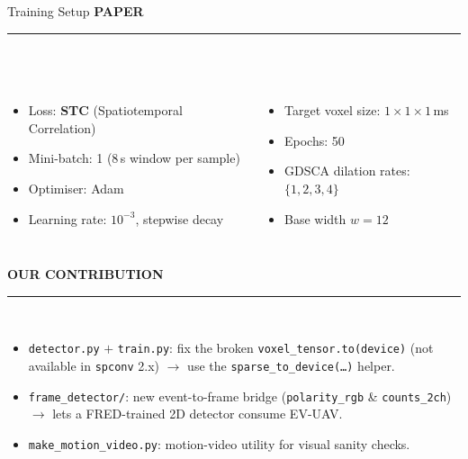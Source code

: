 \documentclass[aspectratio=169,11pt]{beamer}
\begin{document}
\begin{frame}{Training Setup}
  \vspace{0.4em}
  \textbf{\large PAPER}\\
  \rule{0.95\linewidth}{0.3pt}\\[0.4em]
  \begin{columns}[T,onlytextwidth]
    \begin{itemize}
      \setlength\itemsep{0.2em}
      \item Loss: \textbf{STC} (Spatiotemporal Correlation)
      \item Mini-batch: 1 (8\,s window per sample)
      \item Optimiser: Adam
      \item Learning rate: $10^{-3}$, stepwise decay
    \end{itemize}
    \begin{itemize}
      \setlength\itemsep{0.2em}
      \item Target voxel size: $1\!\times\!1\!\times\!1$\,ms
      \item Epochs: 50
      \item GDSCA dilation rates: $\{1,2,3,4\}$
      \item Base width $w\!=\!12$
    \end{itemize}
  \end{columns}

  \vspace{0.6em}
  \textbf{\large OUR CONTRIBUTION}\\
  \rule{0.95\linewidth}{0.3pt}\\[0.4em]
  \begin{itemize}
    \setlength\itemsep{0.2em}
    \item \texttt{detector.py} $+$ \texttt{train.py}: fix the broken
          \texttt{voxel\_tensor.to(device)} (not available in \texttt{spconv} 2.x)
          $\to$ use the \texttt{sparse\_to\_device(\dots)} helper.
    \item \texttt{frame\_detector/}: new event-to-frame bridge (\texttt{polarity\_rgb} \& \texttt{counts\_2ch})
          $\to$ lets a FRED-trained 2D detector consume EV-UAV.
    \item \texttt{make\_motion\_video.py}: motion-video utility for visual sanity checks.
  \end{itemize}
\end{frame}
\end{document}
